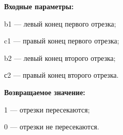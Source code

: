 \textbf{Входные параметры:}  
 
b1 --- левый конец первого отрезка;
 
c1 --- правый конец первого отрезка;
 
b2 --- левый конец второго отрезка;
 
с2 --- правый конец второго отрезка.

\textbf{Возвращаемое значение:}
 
1 --- отрезки пересекаются;
 
0 --- отрезки не пересекаются.
